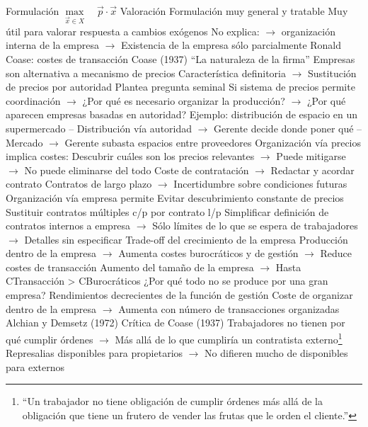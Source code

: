 \documentclass{nuevotema}
\begin{document}
\begin{esquemal}
				\4 Formulación
				\4[] $\underset{\vec{x} \in X}{\max} \quad \vec{p}\cdot \vec{x}$
				\4 Valoración
				\4[] Formulación muy general y tratable
				\4[] Muy útil para valorar respuesta a cambios exógenos
				\4[] No explica:
				\4[] $\to$ organización interna de la empresa
				\4[] $\to$ Existencia de la empresa sólo parcialmente
			\3 Ronald Coase: costes de transacción
				\4 Coase (1937)
				\4[] ``La naturaleza de la firma''
				\4 Empresas son alternativa a mecanismo de precios
				\4[] Característica definitoria
				\4[] $\to$ Sustitución de precios por autoridad
				\4 Plantea pregunta seminal
				\4[] Si sistema de precios permite coordinación
				\4[] $\to$ ¿Por qué es necesario organizar la producción?
				\4[] $\to$ ¿Por qué aparecen empresas basadas en autoridad?
				\4[] Ejemplo: distribución de espacio en un supermercado
				\4[] -- Distribución vía autoridad
				\4[] $\to$ Gerente decide donde poner qué
				\4[] -- Mercado
				\4[] $\to$ Gerente subasta espacios entre proveedores
				\4 Organización vía precios implica costes:
				\4[] Descubrir cuáles son los precios relevantes
				\4[] $\to$ Puede mitigarse
				\4[] $\to$ No puede eliminarse del todo
				\4[] Coste de contratación
				\4[] $\to$ Redactar y acordar contrato
				\4[] Contratos de largo plazo
				\4[] $\to$ Incertidumbre sobre condiciones futuras
				\4 Organización vía empresa permite
				\4[] Evitar descubrimiento constante de precios
				\4[] Sustituir contratos múltiples c/p por contrato l/p
				\4[] Simplificar definición de contratos internos a empresa
				\4[] $\to$ Sólo límites de lo que se espera de trabajadores
				\4[] $\to$ Detalles sin especificar
				\4 Trade-off del crecimiento de la empresa
				\4[] Producción dentro de la empresa
				\4[] $\to$ Aumenta costes burocráticos y de gestión
				\4[] $\to$ Reduce costes de transacción
				\4[] Aumento del tamaño de la empresa
				\4[] $\to$ Hasta CTransacción > CBurocráticos
				\4 ¿Por qué todo no se produce por una gran empresa?
				\4[] Rendimientos decrecientes de la función de gestión
				\4[] Coste de organizar dentro de la empresa
				\4[] $\to$ Aumenta con número de transacciones organizadas
			\3 Alchian y Demsetz (1972)
				\4 Crítica de Coase (1937)
				\4[] Trabajadores no tienen por qué cumplir órdenes
				\4[] $\to$ Más allá de lo que cumpliría un contratista externo\footnote{``Un trabajador no tiene obligación de cumplir órdenes más allá de la obligación que tiene un frutero de vender las frutas que le orden el cliente.''}
				\4[] Represalias disponibles para propietarios
				\4[] $\to$ No difieren mucho de disponibles para externos

\end{esquemal}
\end{document}
